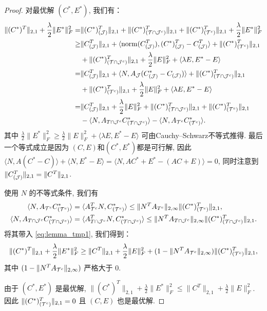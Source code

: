 \begin{proof}
  对最优解 \((C^{*},E^{*})\), 我们有：
  \begin{align}
    \|(C^*)^T\|_{2,1}+\frac{\lambda}{2}\|E^*\|_F^2 =& \|(C^*)^T_{(\mathcal{J})}\|_{2,1}+\|(C^*)^T_{(\mathcal{T}\cap \mathcal{J}^c)}\|_{2,1}+
    \|(C^*)^T_{(\mathcal{T}^c)}\|_{2,1} + \frac{\lambda}{2} \|E^*\|^2_F\nonumber\\
    \geq&\|C^T_{(\mathcal{J})}\|_{2,1}+\langle \operatorname{norm}(C^T_{(\mathcal{J})}),(C^*)^T_{(\mathcal{J})}-C^T_{(\mathcal{J})}
    \rangle+\|(C^*)^T_{(\mathcal{T}^c)}\|_{2,1}\nonumber \\
    &+\|(C^*)^T_{(\mathcal{T}\cap \mathcal{J}^c)}\|_{2,1}+\frac{\lambda}{2} \|E\|^2_F +\langle
    \lambda E,E^*-E\rangle\nonumber\\
    =&\|C^T_{(\mathcal{J})}\|_{2,1}+\langle N,A_{\mathcal{J}}(C^*_{(\mathcal{J})}-C_{(\mathcal{J})})\rangle
     +\|(C^*)^T_{(\mathcal{T}\cap\mathcal{J}^c)}\|_{2,1}\nonumber\\
     &+\|(C^*)^T_{(\mathcal{T}^c)}\|_{2,1} + \frac{\lambda}{2} \|E\|^2_F +\langle
    \lambda E,E^*-E\rangle\nonumber\\
    =&\|C^T_{(\mathcal{J})}\|_{2,1}+\frac{\lambda}{2} \|E\|_F^2+ \|(C^*)^T_{(\mathcal{T}\cap
    \mathcal{J}^c)}\|_{2,1}+\|(C^*)^T_{(\mathcal{T}^c)}\|_{2,1}\nonumber\\
    &-\langle N,A_{T\cap \mathcal{J}^c}C^*_{(\mathcal{T}\cap \mathcal{J}^c)}\rangle
    -\langle N,A_{\mathcal{T}^c}C^*_{(\mathcal{T}^c)}\rangle.
    \label{eq:lemma_tmp1}
  \end{align}
  其中 \(\frac{\lambda}{2} \|E^*\|_F^2 \geq \frac{\lambda}{2} \|E\|_F^2 +\langle
  \lambda E,E^*-E\rangle\) 可由Cauchy–Schwarz不等式推得.
  最后一个等式成立是因为 \((C,E)\)和\((C^*,E^*)\)都是可行解, 因此\(\langle
  N,A(C^*-C)\rangle+\langle N,E^*-E\rangle = \langle
  N,AC^*+E^*-(AC+E)\rangle=0\), 同时注意到 \(\| C^T_{(\mathcal{J})}\|_{2, 1} = \|C^T\|_{2, 1}\).

  使用 \(N\) 的不等式条件, 我们有
  \begin{align*}
    \langle N,A_{\mathcal{T}^c}C^*_{(\mathcal{T}^c)}\rangle&= \langle A_{\mathcal{T}^c}^TN,C^*_{(\mathcal{T}^c)}\rangle
    \leq \|N^T
    A_{T^{c}}\|_{2,\infty}\|(C^*)^T_{(\mathcal{T}^c)}\|_{2,1}, \\
    \langle N,A_{T\cap \mathcal{J}^c}C^*_{(\mathcal{T}\cap \mathcal{J}^c)}\rangle&= 
    \langle A_{T\cap \mathcal{J}^c}^TN,C^*_{(\mathcal{T}\cap \mathcal{J}^c)}\rangle
    \leq \|N^T A_{T\cap \mathcal{J}^{c}}\|_{2,\infty}\|(C^*)^T_{(\mathcal{T}\cap
    \mathcal{J}^c)}\|_{2,1}. 
  \end{align*}
  将其带入 \eqref{eq:lemma_tmp1}, 我们得到：
  \begin{equation*}
    \|(C^*)^T\|_{2,1}+\frac{\lambda}{2} \|E^*\|^2_F \geq \|C^T\|_{2,1}+ \frac{\lambda}{2} 
    \|E\|_F^2 +(1-\|N^T A_{\mathcal{T}^c}\|_{2, \infty})\|(C^*)^T_{(\mathcal{T}^c)}\|_{2,1},
  \end{equation*}
  其中 \((1-\|N^T A_{\mathcal{T}^c}\|_{2, \infty})\) 严格大于 \(0\).

  由于 \((C^*,E^*)\) 是最优解, \(\|(C^*)^T\|_{2,1}+\frac{\lambda}{2}
  \|E^*\|_F^2\leq \|C^T\|_{2, 1}+\frac{\lambda}{2} \|E\|_F^2\). 
  因此 \(\|(C^*)^T_{(\mathcal{T}^c)}\|_{2,1}=0\) 且 \((C,E)\) 也是最优解.
\end{proof}

